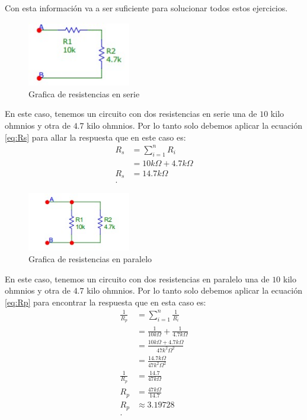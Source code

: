 \documentclass[a4paper, amsfonts, amssymb, amsmath, reprint, showkeys, nofootinbib, twoside]{revtex4-1}
\begin{document}
Con esta información va a ser suficiente para solucionar todos estos ejercicios.

\begin{figure}[H]
  \centering
  \includegraphics[width=0.4\textwidth]{Graficas/circuito_1.jpeg}
  \caption{Grafica de resistencias en serie}
  \label{fig:circuito_1}
\end{figure}

En este caso, tenemos un circuito con dos resistencias en serie una de $10$ kilo ohmnios y otra de $4.7$ kilo ohmnios. Por lo tanto solo debemos aplicar la ecuación \ref{eq:Rs} para allar la respuesta que en este caso es:
\begin{align*}
  R_s &= \sum_{i=1}^{n} R_i \\
  &= 10k \Omega+ 4.7k \Omega\\
  R_s &= 14.7k \Omega\\
.\end{align*}

\begin{figure}[H]
  \centering
  \includegraphics[width=0.4\textwidth]{Graficas/circuito_2.jpeg}
  \caption{Grafica de resistencias en paralelo}
  \label{fig:circuito_2}
\end{figure}

En este caso, tenemos un circuito con dos resistencias en paralelo una de $10$ kilo ohmnios y otra de $4.7$ kilo ohmnios. Por lo tanto solo debemos aplicar la ecuación \ref{eq:Rp} para encontrar la respuesta que en esta caso es:
\begin{align*}
  \frac{1}{R_p}&= \sum_{i=1}^{n} \frac{1}{R_i} \\
  &= \frac{1}{10k\Omega}+\frac{1}{4.7k\Omega} \\
  &= \frac{10k\Omega + 4.7k\Omega}{47k^2\Omega^2} \\
  &= \frac{14.7k\Omega}{47k^2\Omega^2} \\
  \frac{1}{R_p} &= \frac{14.7}{47k\Omega} \\
  R_p &= \frac{47k\Omega}{14.7} \\
  R_p &\approx 3.19728 \\
.\end{align*}
\end{document}

